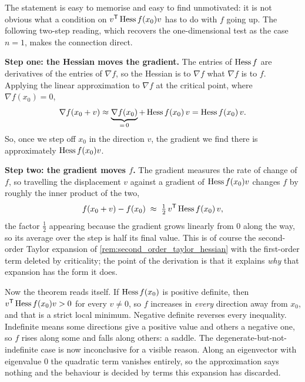 \begin{remark}
\label{rem:hessian_test_intuition}
The statement is easy to memorise and easy to find unmotivated: it is not obvious what a
condition on $v^{\mathsf{T}} \operatorname{Hess} f(x_0) v$ has to do with $f$ going up. The following two-step
reading, which recovers the one-dimensional test as the case $n=1$, makes the connection direct.

\textbf{Step one: the Hessian moves the gradient.} The entries of $\operatorname{Hess} f$ are derivatives of
the entries of $\nabla f$, so the Hessian is to $\nabla f$ what $\nabla f$ is to $f$. Applying
the linear approximation to $\nabla f$ at the critical point, where $\nabla f(x_0) = 0$,
\[\nabla f(x_0+v) \approx \underbrace{\nabla f(x_0)}_{=\,0} + \operatorname{Hess} f(x_0)\,v = \operatorname{Hess} f(x_0)\,v.\]
So, once we step off $x_0$ in the direction $v$, the gradient we find there is approximately
$\operatorname{Hess} f(x_0)v$.

\textbf{Step two: the gradient moves $f$.} The gradient measures the rate of change of $f$, so
travelling the displacement $v$ against a gradient of $\operatorname{Hess} f(x_0)v$ changes $f$ by roughly the
inner product of the two,
\[f(x_0+v) - f(x_0) \;\approx\; \tfrac12\,v^{\mathsf{T}} \operatorname{Hess} f(x_0)\,v,\]
the factor $\tfrac12$ appearing because the gradient grows linearly from $0$ along the way, so
its average over the step is half its final value. This is of course the second-order Taylor
expansion of \cref{rem:second_order_taylor_hessian} with the first-order term deleted by
criticality; the point of the derivation is that it explains \emph{why} that expansion has the
form it does.

Now the theorem reads itself. If $\operatorname{Hess} f(x_0)$ is positive definite, then
$v^{\mathsf{T}} \operatorname{Hess} f(x_0) v > 0$ for every $v \neq 0$, so $f$ increases in \emph{every} direction
away from $x_0$, and that is a strict local minimum. Negative definite reverses every
inequality. Indefinite means some directions give a positive value and others a negative one, so
$f$ rises along some and falls along others: a saddle. The degenerate-but-not-indefinite case is
now inconclusive for a visible reason. Along an eigenvector with eigenvalue $0$ the quadratic
term vanishes entirely, so the approximation says nothing and the behaviour is decided by terms
this expansion has discarded.
\end{remark}

